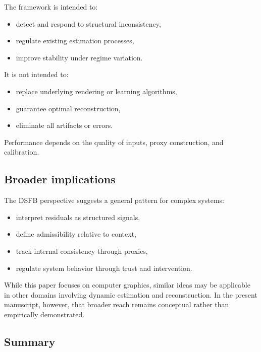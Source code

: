 \documentclass[11pt,letterpaper]{article}
\theoremstyle{gcresult}
\theoremstyle{definition}
\begin{document}
The framework is intended to:

\begin{itemize}[leftmargin=1.5em]
    \item detect and respond to structural inconsistency,
    \item regulate existing estimation processes,
    \item improve stability under regime variation.
\end{itemize}

It is not intended to:

\begin{itemize}[leftmargin=1.5em]
    \item replace underlying rendering or learning algorithms,
    \item guarantee optimal reconstruction,
    \item eliminate all artifacts or errors.
\end{itemize}

Performance depends on the quality of inputs, proxy construction, and calibration.


\subsection{Broader implications}

The DSFB perspective suggests a general pattern for complex systems:

\begin{itemize}[leftmargin=1.5em]
    \item interpret residuals as structured signals,
    \item define admissibility relative to context,
    \item track internal consistency through proxies,
    \item regulate system behavior through trust and intervention.
\end{itemize}

While this paper focuses on computer graphics, similar ideas may be applicable in other domains involving dynamic estimation and reconstruction. In the present manuscript, however, that broader reach remains conceptual rather than empirically demonstrated.


\subsection{Summary}
\end{document}
